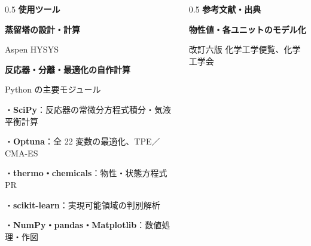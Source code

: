 \begin{frame}[t]

  \vfill

  \begin{columns}[T,onlytextwidth]
    \begin{column}{0.5\textwidth}
      {\footnotesize\bfseries 使用ツール}\par
      \vspace{0.7em}
      {\scriptsize\raggedright\linespread{1.3}\selectfont
        \textbf{蒸留塔の設計・計算}\par
        Aspen HYSYS\par
        \vspace{0.7em}
        \textbf{反応器・分離・最適化の自作計算}\par
        Python の主要モジュール\par
        ・\textbf{SciPy}：反応器の常微分方程式積分・気液平衡計算\par
        ・\textbf{Optuna}：全 22 変数の最適化、TPE／CMA-ES\par
        ・\textbf{thermo・chemicals}：物性・状態方程式 PR\par
        ・\textbf{scikit-learn}：実現可能領域の判別解析\par
        ・\textbf{NumPy・pandas・Matplotlib}：数値処理・作図\par
      }
    \end{column}
    \begin{column}{0.5\textwidth}
      {\footnotesize\bfseries 参考文献・出典}\par
      \vspace{0.7em}
      {\scriptsize\raggedright\linespread{1.3}\selectfont
        \textbf{物性値・各ユニットのモデル化}\par
        改訂六版 化学工学便覧、化学工学会\par
}
\end{column}
\end{columns}
\end{frame}
